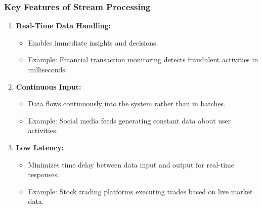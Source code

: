 \documentclass[aspectratio=169]{beamer}
\begin{document}
\begin{frame}[fragile]
    \frametitle{Key Features of Stream Processing}
    \begin{enumerate}
        \item \textbf{Real-Time Data Handling:}
            \begin{itemize}
                \item Enables immediate insights and decisions.
                \item Example: Financial transaction monitoring detects fraudulent activities in milliseconds.
            \end{itemize}
        \item \textbf{Continuous Input:}
            \begin{itemize}
                \item Data flows continuously into the system rather than in batches.
                \item Example: Social media feeds generating constant data about user activities.
            \end{itemize}
        \item \textbf{Low Latency:}
            \begin{itemize}
                \item Minimizes time delay between data input and output for real-time responses.
                \item Example: Stock trading platforms executing trades based on live market data.
            \end{itemize}
    \end{enumerate}
\end{frame}
\end{document}
